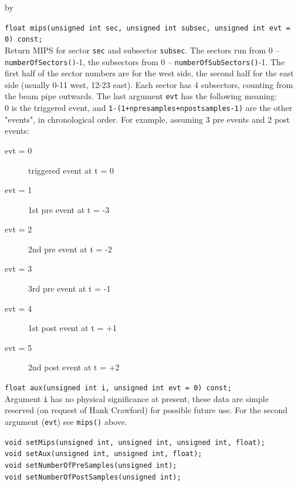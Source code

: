 \documentclass[twoside]{article}
\newcommand{\entrylabel}[1]{\mbox{\textbf{{#1}}}\hfil}%
\newenvironment{entry}
{\begin{list}{}%
    {\renewcommand{\makelabel}{\entrylabel}%
     \setlength{\labelwidth}{90pt}%
     \setlength{\leftmargin}{\labelwidth}
     \advance\leftmargin by \labelsep%
      }%
    }%
  {\end{list}}
\newcommand{\Entrylabel}[1]%
{\raisebox{0pt}[1ex][0pt]{\makebox[\labelwidth][l]%
    {\parbox[t]{\labelwidth}{\hspace{0pt}\textbf{{#1}}}}}}
\newenvironment{Entry}%
{\renewcommand{\entrylabel}{\Entrylabel}\begin{entry}}%
  {\end{entry}}
\begin{document}
\begin{Entry}
    \verb+float mips(unsigned int sec, unsigned int subsec, unsigned int evt = 0) const;+\\
    Return MIPS for sector \texttt{sec} and subsector \texttt{subsec}.
    The sectors run from 0 -- \texttt{numberOfSectors()}-1, the
    subsectors from 0 -- \texttt{numberOfSubSectors()}-1. The first
    half of the sector numbers are for the west side, the second half
    for the east side (usually 0-11 west, 12-23 east). Each sector has
    4 subsectors, counting from the beam pipe outwards. The last
    argument \texttt{evt} has
    the following meaning:\\
    0 is the triggered event, and
    \texttt{1-(1+npresamples+npostsamples-1)} are the other "events",
    in chronological order.  For example, assuming 3 pre events and 2
    post events:
    \begin{description}
    \item[evt = 0] triggered event at t = 0
    \item[evt = 1] 1st pre event at t = -3
    \item[evt = 2] 2nd pre event at t = -2
    \item[evt = 3] 3rd pre event at t = -1
    \item[evt = 4] 1st post event at t = +1
    \item[evt = 5] 2nd post event at t = +2
    \end{description}    
       
    \verb+float aux(unsigned int i, unsigned int evt = 0) const;+\\
    Argument \texttt{i} has no physical significance at present, these
    data are simple reserved (on request of Hank Crawford) for
    possible future use.  For the second argument (\texttt{evt}) see
    \texttt{mips()} above.
    
    \verb+void setMips(unsigned int, unsigned int, unsigned int, float);+\\
    \verb+void setAux(unsigned int, unsigned int, float);+\\
    \verb+void setNumberOfPreSamples(unsigned int);+\\
    \verb+void setNumberOfPostSamples(unsigned int);+\\
\end{Entry}
\clearpage
\end{document}
